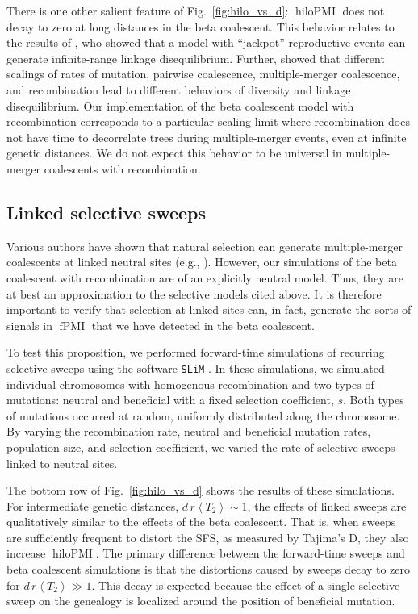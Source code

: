 \documentclass[11pt, letterpaper]{article}   	%
\newcommand{\fig}[1]{Fig.~\ref{#1}}
\newcommand{\E}[1]{\left< #1 \right>}
\DeclareMathOperator{\fpmi}{fPMI}
\DeclareMathOperator{\hilopmi}{hiloPMI}
\begin{document}
There is one other salient feature of \fig{fig:hilo_vs_d}: $\hilopmi$ does not decay to zero at long distances in the beta coalescent.
This behavior relates to the results of \textcite{EldonWakeley2006}, who showed that a model with ``jackpot'' reproductive events can generate infinite-range linkage disequilibrium.
Further, \textcite{EldonWakeley2006} showed that different scalings of rates of mutation, pairwise coalescence, multiple-merger coalescence, and recombination lead to different behaviors of diversity and linkage disequilibrium.
Our implementation of the beta coalescent model with recombination corresponds to a particular scaling limit where recombination does not have time to decorrelate trees during multiple-merger events, even at infinite genetic distances.
We do not expect this behavior to be universal in multiple-merger coalescents with recombination.

\subsection*{Linked selective sweeps}

Various authors have shown that natural selection can generate multiple-merger coalescents at linked neutral sites (e.g., \cite{DurrettSchweinsberg2005, CoopRalph2012, NeherHallatschek2013, DesaiEtAl2013, SegerEtAl2010}).
However, our simulations of the beta coalescent with recombination are of an explicitly neutral model.
Thus, they are at best an approximation to the selective models cited above.
It is therefore important to verify that selection at linked sites can, in fact, generate the sorts of signals in $\fpmi$ that we have detected in the beta coalescent.

To test this proposition, we performed forward-time simulations of recurring selective sweeps using the software \texttt{SLiM} \autocite{Messer2013}.
In these simulations, we simulated individual chromosomes with homogenous recombination and two types of mutations: neutral and beneficial with a fixed selection coefficient, $s$.
Both types of mutations occurred at random, uniformly distributed along the chromosome.
By varying the recombination rate, neutral and beneficial mutation rates, population size, and selection coefficient, we varied the rate of selective sweeps linked to neutral sites.

The bottom row of \fig{fig:hilo_vs_d} shows the results of these simulations.
For intermediate genetic distances, $d\,r \E{T_2} \sim 1$, the effects of linked sweeps are qualitatively similar to the effects of the beta coalescent.
That is, when sweeps are sufficiently frequent to distort the SFS, as measured by Tajima's D, they also increase $\hilopmi$.
The primary difference between the forward-time sweeps and beta coalescent simulations is that the distortions caused by sweeps decay to zero for $d\,r \E{T_2} \gg 1$.
This decay is expected because the effect of a single selective sweep on the genealogy is localized around the position of beneficial mutation.
\end{document}
